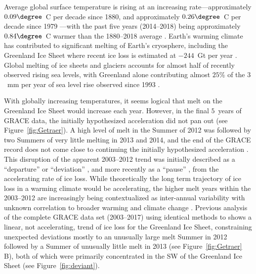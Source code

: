 \documentclass[11pt]{report}
\begin{document}
Average global surface temperature is rising at an increasing rate---approximately $0.09\degree$~C per decade since 1880, and approximately $0.26\degree$~C per decade since 1979 \cite[][]{ipcc2013_atmosphere}---with the past five years (2014--2018) being approximately $0.84\degree$~C warmer than the 1880--2018 average \cite[][]{NOAA_stateofclimate}. Earth's warming climate has contributed to significant melting of Earth's cryosphere, including the Greenland Ice Sheet where recent ice loss is estimated at $-244$~Gt per
year \cite[][]{ipcc2013_cryosphere,Harig+2015a,Harig+2016}. 
Global melting of ice sheets and glaciers accounts for almost half of recently observed rising sea levels, with Greenland alone contributing almost $25$\% of the $3$~mm per year of sea level rise observed since 1993
\cite[][]{Nerem}. 



With globally increasing temperatures, it seems logical that melt on the Greenland Ice Sheet would increase each year. However, in the final $5$~years of GRACE data, the initially hypothesized acceleration did not pan out (see Figure~\ref{fig:Getraer}). A high level of melt in the Summer of 2012 was followed by two Summers of very little melting in 2013 and 2014, and the end of the GRACE record does not come close to continuing the initially hypothesized acceleration  \cite[see
Figure~\ref{fig:Getraer} A, comparable to][their
Figure~4]{Harig+2016}. This disruption of the apparent 2003--2012 trend was initially described as a ``departure'' or ``deviation'' \cite[][]{Harig+2016}, and more recently as a ``pause'' \cite[][]{bevis2019}, from the accelerating rate of ice loss. While theoretically the long term trajectory of ice loss in a warming climate would be accelerating, the higher melt years within the 2003--2012 are increasingly being contextualized as inter-annual variability with unknown correlation to broader warming and climate change \cite[][]{mattingly2018,hahn2018,bevis2019}. Previous analysis of the complete GRACE data set (2003--2017) using identical methods to \cite{Harig+2016} shows a linear, not accelerating, trend of ice loss for the Greenland Ice Sheet, constraining unexpected deviations mostly to an unusually large melt Summer in 2012 followed by a Summer of unusually little melt in 2013 (see
Figure~\ref{fig:Getraer} B), both of which were primarily concentrated in the SW of the Greenland Ice Sheet (see Figure~\ref{fig:deviant}). 
\end{document}
